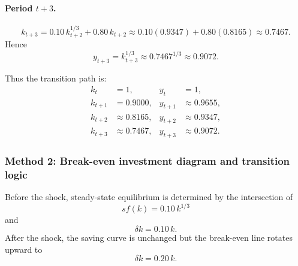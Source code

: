 \documentclass[12pt]{article}
\begin{document}
\begin{enumerate}[label=(\alph*)]
    \paragraph{Period \(t+3\).}
    \[
    k_{t+3}=0.10\,k_{t+2}^{1/3}+0.80\,k_{t+2}
    \approx 0.10(0.9347)+0.80(0.8165)\approx 0.7467.
    \]
    Hence
    \[
    y_{t+3}=k_{t+3}^{1/3}\approx 0.7467^{1/3}\approx 0.9072.
    \]

    Thus the transition path is:
    \[
    \boxed{
    \begin{aligned}
    k_t&=1,      & y_t&=1,\\
    k_{t+1}&=0.9000, & y_{t+1}&\approx 0.9655,\\
    k_{t+2}&\approx 0.8165, & y_{t+2}&\approx 0.9347,\\
    k_{t+3}&\approx 0.7467, & y_{t+3}&\approx 0.9072.
    \end{aligned}}
    \]
\end{enumerate}

\subsubsection{Method 2: Break-even investment diagram and transition logic}
Before the shock, steady-state equilibrium is determined by the intersection of
\[
s f(k)=0.10\,k^{1/3}
\]
and
\[
\delta k=0.10\,k.
\]
After the shock, the saving curve is unchanged but the break-even line rotates upward to
\[
\delta k=0.20\,k.
\]
\end{document}

